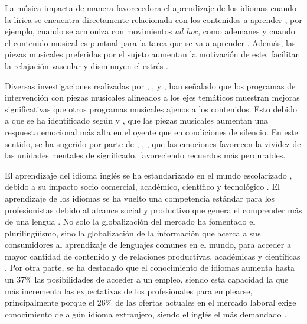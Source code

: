 \documentclass[spanish]{textolivre}
\begin{document}
La música impacta de manera favorecedora el aprendizaje de los idiomas cuando la lírica se encuentra directamente relacionada con los contenidos a aprender \cite{widerman2013study, harding2019cortical}, por ejemplo, cuando se armoniza con movimientos \emph{ad hoc}, como ademanes y cuando el contenido musical es puntual para la tarea que se va a aprender \cite{galinska2015music, biasutti2019self}. Además, las piezas musicales preferidas por el sujeto aumentan la motivación de este, facilitan la relajación vascular y disminuyen el estrés \cite{mcclurkin2016duration}. 

Diversas investigaciones realizadas por \textcite{skeja2014impact}, \textcite{hafting2018benefits}, \textcite{azaryahu2020musimath} y \textcite{hakvoort2022music}, han señalado que los programas de intervención con piezas musicales alineados a los ejes temáticos muestran mejoras significativas que otros programas musicales ajenos a los contenidos. Esto debido a que se ha identificado según \textcite{perham2011can} y \textcite{penagos2012efectos}, que las piezas musicales aumentan una respuesta emocional más alta en el oyente que en condiciones de silencio. En este sentido, se ha sugerido por parte de \textcite{damasio2000feeling}, \textcite{manes2014usar}, \textcite{kyriazi2018}, que las emociones favorecen la vividez de las unidades mentales de significado, favoreciendo recuerdos más perdurables.

El aprendizaje del idioma inglés se ha estandarizado en el mundo escolarizado \cite{legacy2017dog}, debido a su impacto socio comercial, académico, científico y tecnológico \cite{delos2020grammatical}. El aprendizaje de los idiomas se ha vuelto una competencia estándar para los profesionistas debido al alcance social y productivo que genera el comprender más de una lengua \cite{vagh2009measuring}. No solo la globalización del mercado ha fomentado el plurilingüismo, sino la globalización de la información que acerca a sus consumidores al aprendizaje de lenguajes comunes en el mundo, para acceder a mayor cantidad de contenido y de relaciones productivas, académicas y científicas \cite{core2013total}. Por otra parte, se ha destacado que el conocimiento de idiomas aumenta hasta un 37\% las posibilidades de acceder a un empleo, siendo esta capacidad la que más incrementa las expectativas de los profesionales para emplearse, principalmente porque el 26\% de las ofertas actuales en el mercado laboral exige conocimiento de algún idioma extranjero, siendo el inglés el más demandado \cite{randstad2017}.
\end{document}
